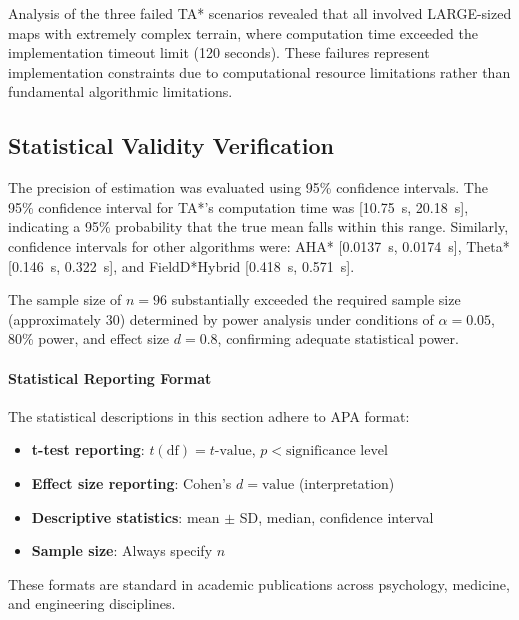 Analysis of the three failed TA* scenarios revealed that all involved LARGE-sized maps with extremely complex terrain, where computation time exceeded the implementation timeout limit (120 seconds). These failures represent implementation constraints due to computational resource limitations rather than fundamental algorithmic limitations.

\subsection{Statistical Validity Verification}

The precision of estimation was evaluated using 95\% confidence intervals. The 95\% confidence interval for TA*'s computation time was [10.75~s, 20.18~s], indicating a 95\% probability that the true mean falls within this range. Similarly, confidence intervals for other algorithms were: AHA* [0.0137~s, 0.0174~s], Theta* [0.146~s, 0.322~s], and FieldD*Hybrid [0.418~s, 0.571~s].

The sample size of $n = 96$ substantially exceeded the required sample size (approximately 30) determined by power analysis under conditions of $\alpha = 0.05$, 80\% power, and effect size $d = 0.8$, confirming adequate statistical power.

\paragraph{Statistical Reporting Format}
The statistical descriptions in this section adhere to APA format:
\begin{itemize}
    \item \textbf{t-test reporting}: $t(\text{df}) = t\text{-value}$, $p < \text{significance level}$
    \item \textbf{Effect size reporting}: Cohen's $d = \text{value}$ (interpretation)
    \item \textbf{Descriptive statistics}: mean $\pm$ SD, median, confidence interval
    \item \textbf{Sample size}: Always specify $n$
\end{itemize}

These formats are standard in academic publications across psychology, medicine, and engineering disciplines.
